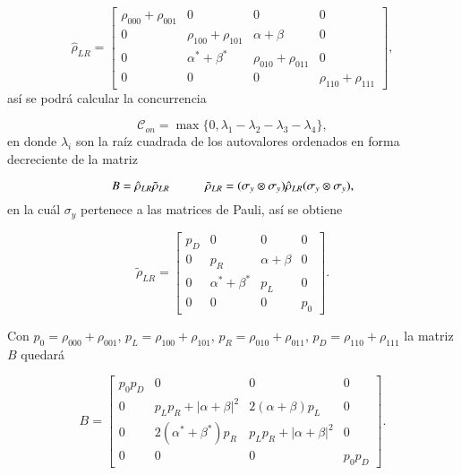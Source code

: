 \begin{appendixs}
\begin{equation*}
    \hat{\rho}_{LR} = 
    \begin{bmatrix}
        \rho_{000}+\rho_{001} & 0 & 0 & 0  \\
        0 & \rho_{100} + \rho_{101} & \alpha + \beta & 0  \\
        0 & \alpha^{*} +\beta^{*} & \rho_{010} + \rho_{011} & 0  \\
        0 & 0 & 0 & \rho_{110} + \rho_{111} 
        \end{bmatrix},
\end{equation*}
así se podrá calcular la concurrencia 

\begin{equation*}
    \mathcal{C}_{on} = \max \{ 0,\lambda_{1} - \lambda_{2} - \lambda_{3} - \lambda_{4} \},
\end{equation*}
en donde $\lambda_{i}$ son la raíz cuadrada de los autovalores ordenados en forma decreciente de la matriz

\begin{equation*}
    B = \hat{\rho}_{LR} \tilde{\rho}_{LR} \hspace{10mm} \tilde{\rho}_{LR} = (\sigma_{y} \otimes \sigma_{y}) \hat{\rho}_{LR} (\sigma_{y} \otimes \sigma_{y}),
\end{equation*}
en la cuál $\sigma_{y}$ pertenece a las matrices de Pauli, así se obtiene

\begin{equation*}
    \tilde{\rho}_{LR} = 
    \begin{bmatrix}
        p_{D} & 0 & 0 & 0  \\
        0 & p_{R} & \alpha + \beta & 0  \\
        0 & \alpha^{*} +\beta^{*} & p_{L} & 0  \\
        0 & 0 & 0 & p_{0} 
        \end{bmatrix}.
\end{equation*}

Con  $p_{0}=\rho_{000}+\rho_{001}$, $p_{L}=\rho_{100} + \rho_{101}$, $p_{R}=\rho_{010}+\rho_{011}$, $p_{D}=\rho_{110}+\rho_{111}$ la matriz $B$ quedará

\begin{equation*}
    B = 
    \begin{bmatrix}
        p_{0}p_{D} & 0 & 0 & 0  \\
        0 & p_{L}p_{R}+|\alpha+\beta|^{2} & 2(\alpha + \beta)p_{L} & 0  \\
        0 & 2(\alpha^{*} +\beta^{*})p_{R} & p_{L}p_{R}+|\alpha+\beta|^{2}  & 0  \\
        0 & 0 & 0 & p_{0}p_{D}
        \end{bmatrix}.
\end{equation*}


\end{appendixs}
